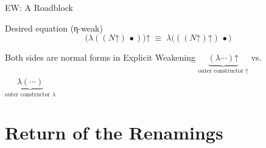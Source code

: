 \documentclass[pdftex,aspectratio=169]{beamer}
\newcommand{\Blob}{\ensuremath{\bullet}}
\newcommand{\Wk}{\ensuremath{\mathord{\uparrow}}}
\begin{document}
\begin{frame}{EW: A Roadblock}
      \begin{block}{Desired equation (η-weak)}
        \[
        \bigl(\lambda((N\Wk)\,\Blob)\bigr)\Wk
        \;\equiv\;
        \lambda\bigl(((N\Wk)\Wk)\,\Blob\bigr)
        \]
      \end{block}
      \begin{alertblock}{Both sides are normal forms in Explicit Weakening}
        \centering
        \vspace{.5em}
        \Large
        \(\underbrace{(\lambda\cdots)\Wk}_{\text{outer constructor }\Wk}\)
        \quad vs.\quad
        \(\underbrace{\lambda(\cdots)}_{\text{outer constructor }\lambda}\)
        \vspace{.5em}
      \end{alertblock}


\end{frame}

\section{Return of the Renamings}
\end{document}
